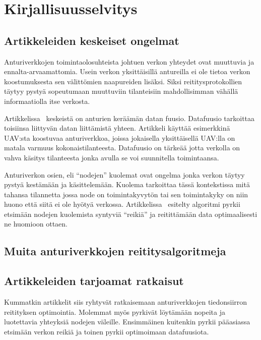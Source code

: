 \section{Kirjallisuusselvitys}

\subsection{Artikkeleiden keskeiset ongelmat}

Anturiverkkojen toimintaolosuhteista johtuen verkon yhteydet ovat muuttuvia ja
ennalta-arvaamattomia. Usein verkon yksittäisillä antureilla ei ole tietoa
verkon koostumuksesta sen välittömien naapureiden lisäksi. Siksi
reititysprotokollien täytyy pystyä sopeutumaan muuttuviin tilanteisiin
mahdollisimman vähällä informaatiolla itse verkosta.

Artikkelissa~\cite{Yu2006} keskeistä on anturien keräämän datan fuusio.
Datafuusio tarkoittaa toisiinsa liittyvän datan liittämistä yhteen. Artikkeli
käyttää esimerkkinä UAV:sta koostuvaa anturiverkkoa, joissa jokaisella
yksittäisellä UAV:lla on matala varmuus kokonaistilanteesta. Datafuusio on
tärkeää jotta verkolla on vahva käsitys tilanteesta jonka avulla se voi
suunnitella toimintaansa.

Anturiverkon osien, eli ``nodejen'' kuolemat ovat ongelma jonka verkon täytyy
pystyä kestämään ja käsittelemään. Kuolema tarkoittaa tässä kontekstissa mitä
tahansa tilannetta jossa node on toimintakyvytön tai sen toimintakyky on niin
huono että siitä ei ole hyötyä verkossa. Artikkelissa~\cite{Arya2015} esitelty
algoritmi pyrkii etsimään nodejen kuolemista syntyviä ``reikiä'' ja reitittämään
data optimaalisesti ne huomioon ottaen.

\subsection{Muita anturiverkkojen reititysalgoritmeja}

\subsection{Artikkeleiden tarjoamat ratkaisut}

Kummatkin artikkelit siis ryhtyvät ratkaisemaan anturiverkkojen tiedonsiirron
reitityksen optimointia. Molemmat myös pyrkivät löytämään nopeita ja
luotettavia yhteyksiä nodejen väleille. Ensimmäinen kuitenkin pyrkii pääasiassa
etsimään verkon reikiä ja toinen pyrkii optimoimaan datafuusiota.


